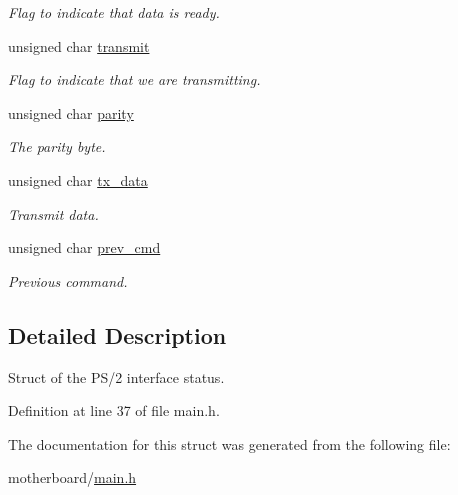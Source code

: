 \begin{CompactItemize}
\begin{CompactList}\small\item\em Flag to indicate that data is ready. \item\end{CompactList}\item 
\hypertarget{structPS2__STRUCT_76ffe26b85887a64f922f8fb96be8072}{
unsigned char \hyperlink{structPS2__STRUCT_76ffe26b85887a64f922f8fb96be8072}{transmit}}
\label{structPS2__STRUCT_76ffe26b85887a64f922f8fb96be8072}

\begin{CompactList}\small\item\em Flag to indicate that we are transmitting. \item\end{CompactList}\item 
\hypertarget{structPS2__STRUCT_6c98edf2f5d24b6734ce5674340994b0}{
unsigned char \hyperlink{structPS2__STRUCT_6c98edf2f5d24b6734ce5674340994b0}{parity}}
\label{structPS2__STRUCT_6c98edf2f5d24b6734ce5674340994b0}

\begin{CompactList}\small\item\em The parity byte. \item\end{CompactList}\item 
\hypertarget{structPS2__STRUCT_aef1355cc42993fbdfb7b1ce676152e1}{
unsigned char \hyperlink{structPS2__STRUCT_aef1355cc42993fbdfb7b1ce676152e1}{tx\_\-data}}
\label{structPS2__STRUCT_aef1355cc42993fbdfb7b1ce676152e1}

\begin{CompactList}\small\item\em Transmit data. \item\end{CompactList}\item 
\hypertarget{structPS2__STRUCT_0d1530f587c691bba0ebb734559da16a}{
unsigned char \hyperlink{structPS2__STRUCT_0d1530f587c691bba0ebb734559da16a}{prev\_\-cmd}}
\label{structPS2__STRUCT_0d1530f587c691bba0ebb734559da16a}

\begin{CompactList}\small\item\em Previous command. \item\end{CompactList}\end{CompactItemize}


\subsection{Detailed Description}
Struct of the PS/2 interface status. 

Definition at line 37 of file main.h.

The documentation for this struct was generated from the following file:\begin{CompactItemize}
\item 
motherboard/\hyperlink{motherboard_2main_8h}{main.h}\end{CompactItemize}
